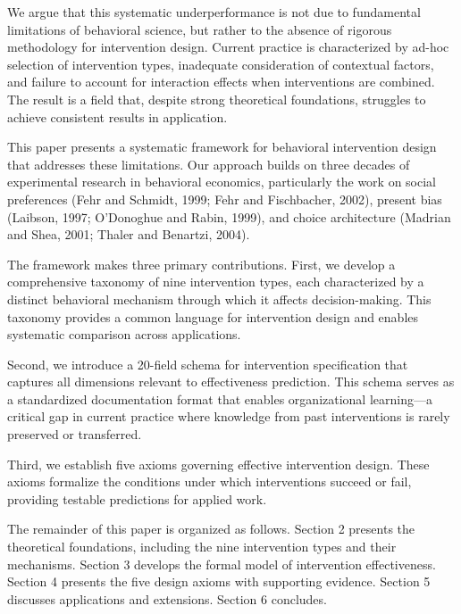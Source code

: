 \documentclass[12pt,a4paper]{article}
\begin{document}
We argue that this systematic underperformance is not due to fundamental limitations of behavioral science, but rather to the absence of rigorous methodology for intervention design. Current practice is characterized by ad-hoc selection of intervention types, inadequate consideration of contextual factors, and failure to account for interaction effects when interventions are combined. The result is a field that, despite strong theoretical foundations, struggles to achieve consistent results in application.

This paper presents a systematic framework for behavioral intervention design that addresses these limitations. Our approach builds on three decades of experimental research in behavioral economics, particularly the work on social preferences (Fehr and Schmidt, 1999; Fehr and Fischbacher, 2002), present bias (Laibson, 1997; O'Donoghue and Rabin, 1999), and choice architecture (Madrian and Shea, 2001; Thaler and Benartzi, 2004).

The framework makes three primary contributions. First, we develop a comprehensive taxonomy of nine intervention types, each characterized by a distinct behavioral mechanism through which it affects decision-making. This taxonomy provides a common language for intervention design and enables systematic comparison across applications.

Second, we introduce a 20-field schema for intervention specification that captures all dimensions relevant to effectiveness prediction. This schema serves as a standardized documentation format that enables organizational learning---a critical gap in current practice where knowledge from past interventions is rarely preserved or transferred.

Third, we establish five axioms governing effective intervention design. These axioms formalize the conditions under which interventions succeed or fail, providing testable predictions for applied work.

The remainder of this paper is organized as follows. Section 2 presents the theoretical foundations, including the nine intervention types and their mechanisms. Section 3 develops the formal model of intervention effectiveness. Section 4 presents the five design axioms with supporting evidence. Section 5 discusses applications and extensions. Section 6 concludes.


\end{document}
